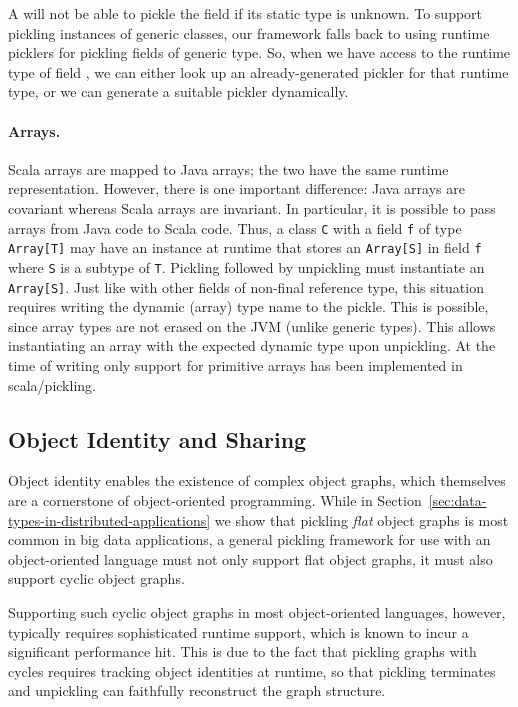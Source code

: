 A  will not be able to pickle the field  if its
static type is unknown. To support pickling instances of generic classes, our
framework falls back to using runtime picklers for pickling fields of generic
type. So, when we have access to the runtime type of field , we can
either look up an already-generated pickler for that runtime type, or we can
generate a suitable pickler dynamically.

\paragraph{Arrays.} Scala arrays are mapped to Java arrays;  the two have the
same runtime representation. However, there is one important difference: Java
arrays are covariant whereas Scala arrays are invariant. In particular, it is
possible to pass arrays from Java code to Scala code. Thus, a class \verb|C|
with a field \verb|f| of type \verb|Array[T]| may have an instance at runtime
that stores an \verb|Array[S]| in field \verb|f| where \verb|S| is a subtype
of \verb|T|. Pickling followed by unpickling must instantiate an
\verb|Array[S]|. Just like with other fields of non-final reference type, this
situation requires writing the dynamic (array) type name to the pickle. This
is possible, since array types are not erased on the JVM (unlike generic
types). This allows instantiating an array with the expected dynamic type upon
unpickling. At the time of writing only support for primitive arrays has been
implemented in scala/pickling.


\subsection{Object Identity and Sharing}
\label{sec:object-identity}

Object identity enables the existence of complex object graphs, which
themselves are a cornerstone of object-oriented programming. While in
Section~\ref{sec:data-types-in-distributed-applications} we show that pickling
\textit{flat} object graphs is most common in big data applications, a general
pickling framework for use with an object-oriented language must not only
support flat object graphs, it must also support cyclic object graphs.

Supporting such cyclic object graphs in most object-oriented languages,
however, typically requires sophisticated runtime support, which is known to
incur a significant performance hit. This is due to the fact that pickling
graphs with cycles requires tracking object identities at runtime, so that
pickling terminates and unpickling can faithfully reconstruct the graph
structure.

